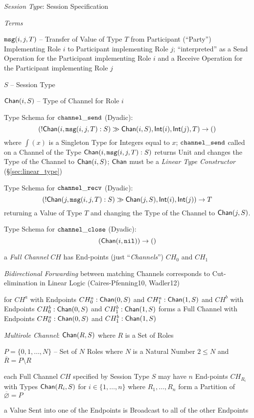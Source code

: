 \emph{Session Type}: Session Specification

\emph{Terms}

$\mathtt{msg}(i,j,T)$ -- Transfer of Value of Type $T$ from Participant
(``Party'') Implementing Role $i$ to Participant implementing Role
$j$; ``interpreted'' as a Send Operation for the Participant
implementing Role $i$ and a Receive Operation for the Participant
implementing Role $j$

$S$ -- Session Type

$\mathsf{Chan}(i,S)$ -- Type of Channel for Role $i$

Type Schema for $\mathtt{channel\_send}$ (Dyadic):
\[
  (!\mathsf{Chan} (i, \mathtt{msg}(i,j,T):S) \gg \mathsf{Chan}(i,S), \mathsf{Int}(i), \mathsf{Int}(j), T)
    \rightarrow \mathsf{()}
\]
where $\int(x)$ is a Singleton Type for Integers equal to $x$;
$\mathtt{channel\_send}$ called on a Channel of the Type
$\mathsf{Chan}(i, \mathtt{msg}(i,j,T):S)$ returns Unit and changes the
Type of the Channel to $\mathsf{Chan}(i,S)$; $\mathsf{Chan}$ must be a
\emph{Linear Type Constructor} (\S\ref{sec:linear_type})

Type Schema for $\mathtt{channel\_recv}$ (Dyadic):
\[
  (!\mathsf{Chan} (j, \mathtt{msg}(i,j,T):S) \gg \mathsf{Chan}(j,S), \mathsf{Int}(i), \mathsf{Int}(j))
    \rightarrow T
\]
returning a Value of Type $T$ and changing the Type of the Channel to
$\mathsf{Chan}(j,S)$.

Type Schema for $\mathtt{channel\_close}$ (Dyadic):
\[
  (\mathsf{Chan}(i, \mathtt{nil})) \rightarrow \mathsf{()}
\]

a \emph{Full Channel} $CH$ has End-points (just ``\emph{Channels}'')
$CH_0$ and $CH_1$


\emph{Bidirectional Forwarding} between matching Channels corresponds
to Cut-elimination in Linear Logic (Caires-Pfenning10, Wadler12)

for $CH^a$ with Endpoints $CH^a_0 : \mathsf{Chan}(0,S)$ and $CH^a_1 :
\mathsf{Chan}(1,S)$ and $CH^b$ with Endpoints $CH^b_0 : \mathsf{Chan}(0,S)$ and
$CH^b_1 : \mathsf{Chan}(1,S)$ forms a Full Channel with Endpoints $CH^a_0 :
\mathsf{Chan}(0,S)$ and $CH^b_1 : \mathsf{Chan}(1,S)$


\emph{Multirole Channel}: $\mathsf{Chan}(R,S)$ where $R$ is a Set of Roles

$P = \{0, 1, \ldots, N\}$ -- Set of $N$ Roles where $N$ is a Natural
Number $2 \leq N$ and $\overline{R} = P \setminus R$

each Full Channel $CH$ specified by Session Type $S$ may have $n$
End-points $CH_{R_i}$ with Types $\mathsf{Chan}(R_i,S)$ for $i \in
\{1,\ldots,n\}$ where $R_1, \ldots, R_n$ form a Partition of
$\overline{\varnothing} = P$

a Value Sent into one of the Endpoints is Broadcast to all of the
other Endpoints

